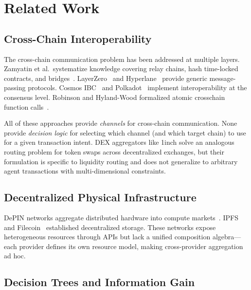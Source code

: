 \documentclass[conference, 10pt, twocolumn]{IEEEtran}
\begin{document}
\section{Related Work}
\label{sec:background}

\subsection{Cross-Chain Interoperability}

The cross-chain communication problem has been addressed at multiple
layers.  Zamyatin et al.\ systematize knowledge covering relay chains,
hash time-locked contracts, and bridges~\cite{zamyatin2021crosschain}.
LayerZero~\cite{zarick2021layerzero} and
Hyperlane~\cite{hyperlane2023docs} provide generic message-passing
protocols.  Cosmos IBC~\cite{kwon2019cosmos} and
Polkadot~\cite{wood2016polkadot} implement interoperability at the
consensus level.  Robinson and Hyland-Wood formalized atomic crosschain
function calls~\cite{robinson2021atomic}.

All of these approaches provide \emph{channels} for cross-chain
communication.  None provide \emph{decision logic} for selecting which
channel (and which target chain) to use for a given transaction intent.
DEX aggregators like 1inch solve an analogous routing problem for token
swaps across decentralized exchanges, but their formulation is specific
to liquidity routing and does not generalize to arbitrary agent
transactions with multi-dimensional constraints.

\subsection{Decentralized Physical Infrastructure}

DePIN networks aggregate distributed hardware into compute
markets~\cite{akash2020decentralized, ionet2024whitepaper}.  IPFS and
Filecoin~\cite{benet2014ipfs} established decentralized storage.
These networks expose heterogeneous resources through APIs but lack a
unified composition algebra---each provider defines its own resource
model, making cross-provider aggregation ad hoc.

\subsection{Decision Trees and Information Gain}
\end{document}
